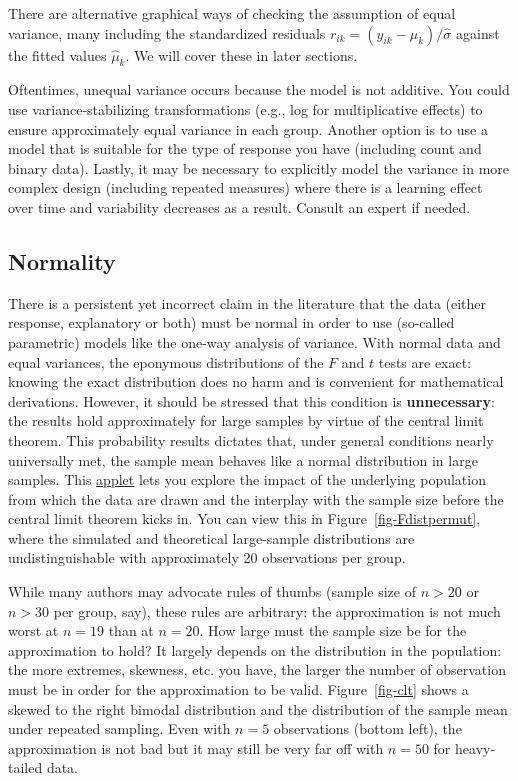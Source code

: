 \documentclass[
  11pt,
  letterpaper,
]{scrbook}
\theoremstyle{definition}
\theoremstyle{definition}
\theoremstyle{remark}
\begin{document}
There are alternative graphical ways of checking the assumption of equal
variance, many including the standardized residuals
\(r_{ik} = (y_{ik} - \widehat{\mu}_k)/\widehat{\sigma}\) against the
fitted values \(\widehat{\mu}_k\). We will cover these in later
sections.

Oftentimes, unequal variance occurs because the model is not additive.
You could use variance-stabilizing transformations (e.g., log for
multiplicative effects) to ensure approximately equal variance in each
group. Another option is to use a model that is suitable for the type of
response you have (including count and binary data). Lastly, it may be
necessary to explicitly model the variance in more complex design
(including repeated measures) where there is a learning effect over time
and variability decreases as a result. Consult an expert if needed.

\subsection{Normality}\label{normality}

There is a persistent yet incorrect claim in the literature that the
data (either response, explanatory or both) must be normal in order to
use (so-called parametric) models like the one-way analysis of variance.
With normal data and equal variances, the eponymous distributions of the
\(F\) and \(t\) tests are exact: knowing the exact distribution does no
harm and is convenient for mathematical derivations. However, it should
be stressed that this condition is \textbf{unnecessary}: the results
hold approximately for large samples by virtue of the central limit
theorem. This probability results dictates that, under general
conditions nearly universally met, the sample mean behaves like a normal
distribution in large samples. This
\href{http://195.134.76.37/applets/AppletCentralLimit/Appl_CentralLimit2.html}{applet}
lets you explore the impact of the underlying population from which the
data are drawn and the interplay with the sample size before the central
limit theorem kicks in. You can view this in
Figure~\ref{fig-Fdistpermut}, where the simulated and theoretical
large-sample distributions are undistinguishable with approximately 20
observations per group.

While many authors may advocate rules of thumbs (sample size of \(n>20\)
or \(n>30\) per group, say), these rules are arbitrary: the
approximation is not much worst at \(n=19\) than at \(n=20\). How large
must the sample size be for the approximation to hold? It largely
depends on the distribution in the population: the more extremes,
skewness, etc. you have, the larger the number of observation must be in
order for the approximation to be valid. Figure~\ref{fig-clt} shows a
skewed to the right bimodal distribution and the distribution of the
sample mean under repeated sampling. Even with \(n=5\) observations
(bottom left), the approximation is not bad but it may still be very far
off with \(n=50\) for heavy-tailed data.
\end{document}
